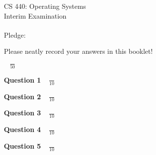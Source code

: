 \documentclass[12pt]{article}
\begin{document}
\vspace*{3in}

\begin{center}

CS 440: Operating Systems\\
Interim Examination  \\ \mbox{} \\
Pledge: \\

\vspace*{.5in}

Please neatly record your answers in this booklet!

\vspace*{.5in}

{\LARGE $\;\;\;\frac{}{50}$ }

\end{center}

\newpage

{\bf Question 1} {\Large $\;\;\;\frac{}{10}$ }

\newpage

{\bf Question 2} {\Large $\;\;\; \frac{}{10}$ }

\newpage

{\bf Question 3} {\Large $\;\;\; \frac{}{10}$ }

\newpage

{\bf Question 4} {\Large $\;\;\; \frac{}{10}$ }

\newpage

{\bf Question 5} {\Large $\;\;\; \frac{}{10}$ }


\end{document}
